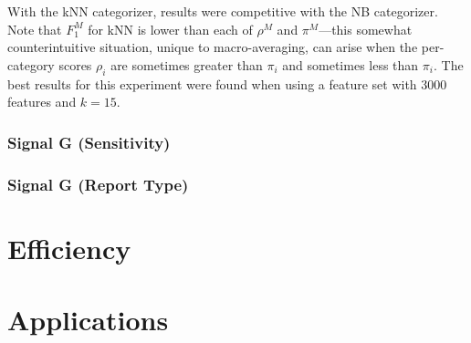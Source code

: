 With the kNN categorizer, results were competitive with the NB
categorizer.  Note that $F_1^M$ for kNN is lower than each of $\rho^M$
and $\pi^M$---this somewhat counterintuitive situation, unique to
macro-averaging, can arise when the per-category scores $\rho_i$ are
sometimes greater than $\pi_i$ and sometimes less than $\pi_i$.  The
best results for this experiment were found when using a feature set
with 3000 features and $k=15$.


\subsubsection{Signal G (Sensitivity)}
\subsubsection{Signal G (Report Type)}

\section{Efficiency}
\label{Efficiency}

\section{Applications}
\label{Applications}
